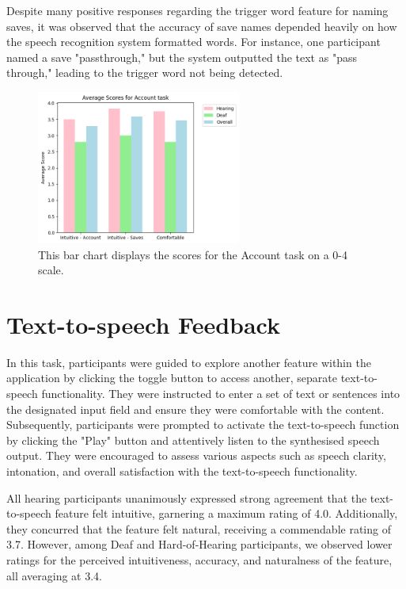 \documentclass{l4proj}
\begin{document}
Despite many positive responses regarding the trigger word feature for naming saves, it was observed that the accuracy of save names depended heavily on how the speech recognition system formatted words. For instance, one participant named a save "passthrough," but the system outputted the text as "pass through," leading to the trigger word not being detected. 

\begin{figure}
    \centering
    \includegraphics[width=0.6\textwidth]{dissertation/images/ACC.png}
    \caption{This bar chart displays the scores for the Account task on a 0-4 scale.}
    \label{fig:ACC-chart}
\end{figure}

\section{Text-to-speech Feedback}

In this task, participants were guided to explore another feature within the application by clicking the toggle button to access another, separate text-to-speech functionality. They were instructed to enter a set of text or sentences into the designated input field and ensure they were comfortable with the content. Subsequently, participants were prompted to activate the text-to-speech function by clicking the "Play" button and attentively listen to the synthesised speech output. They were encouraged to assess various aspects such as speech clarity, intonation, and overall satisfaction with the text-to-speech functionality.

All hearing participants unanimously expressed strong agreement that the text-to-speech feature felt intuitive, garnering a maximum rating of 4.0. Additionally, they concurred that the feature felt natural, receiving a commendable rating of 3.7. However, among Deaf and Hard-of-Hearing participants, we observed lower ratings for the perceived intuitiveness, accuracy, and naturalness of the feature, all averaging at 3.4.
\end{document}
